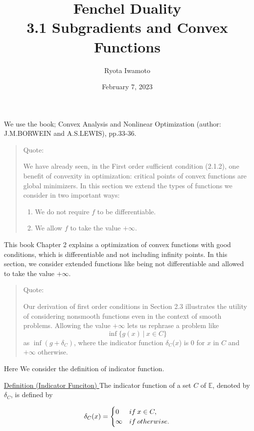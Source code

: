 \documentclass[a4paper,11pt]{jsarticle}
\begin{document}
\title{%
  Fenchel Duality  \\
  \large 3.1 Subgradients and Convex Functions}
\author{Ryota Iwamoto}
\date{February 7, 2023}
\maketitle

We use the book; Convex Analysis and Nonlinear Optimization (author: J.M.BORWEIN and A.S.LEWIS), pp.33-36.

\begin{quote}
  Quote:

  We have already seen, in the First order sufficient condition (2.1.2), one
  benefit of convexity in optimization: critical points of convex functions are
  global minimizers. In this section we extend the types of functions we
  consider in two important ways:

  \qquad
    \begin{enumerate}[label=\roman*,align=CenterWithParen]
      \item We do not require $f$ to be differentiable.
      \item We allow $f$ to take the value $+\infty$.
    \end{enumerate}
\end{quote}

This book Chapter 2 explains a optimization of convex functions with good conditions, which is differentiable and not including infinity points. In this section, we consider extended functions like being not differentiable and allowed to take the value $+\infty$.

\begin{quote}
  Quote:

  Our derivation of first order conditions in Section 2.3  illustrates the utility of considering nonsmooth functions even in the context of smooth problems. Allowing the value $+\infty$ lets us rephrase a problem like
$$ \inf \text{$\{ g(x)\:|\:x \in{C}\}$} $$
as $ \inf \text{$(g+\delta_C)$} $, where the indicator function $\delta_C$($x$) is 0 for $x$ in $C$ and $+\infty$
otherwise.

\end{quote}

Here We consider the definition of indicator function.

\begin{itembox}[l]{\underline{Definition (Indicator Funciton) }}
  The indicator function of a set $C$ of $\mathbb{E}$, denoted by $\delta_C$, is defined by

  \begin{equation}
    \delta_C(x)=
    \begin{cases}
      0 & if\:x \in{C}, \\
      \infty & if\:otherwise. \notag
    \end{cases}
  \end{equation}
\end{itembox}
\end{document}
